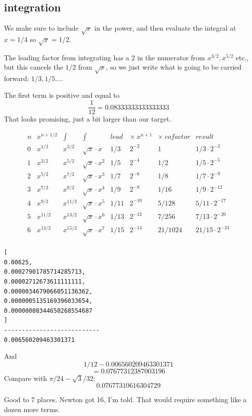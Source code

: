 \documentclass[11pt, oneside]{article}
\begin{document}
\subsection*{integration}

We make sure to include $\sqrt{x}$ in the power, and then evaluate the integral at $x = 1/4$ so $\sqrt{x} = 1/2$.

The leading factor from integrating has a $2$ in the numerator from $x^{3/2}, x^{5/2}$ etc., but this cancels the $1/2$ from $\sqrt{x}$, so we just write what is going to be carried forward:  $1/3, 1/5 \dots$.

The first term is positive and equal to 
\[ \frac{1}{12} = 0.08333333333333333 \]
That looks promising, just a bit larger than our target.

\[
\begin{matrix}
n & x^{n+1/2} & \int & \int & lead & \times \ x^{n+1} & \times \ cofactor & result  \\
0  & x^{1/2} & x^{3/2}  &\sqrt{x} \cdot x & 1/3 & 2^{-2} & 1 & 1/3 \cdot 2^{-2} \\
1  & x^{3/2} & x^{5/2}  & \sqrt{x} \cdot x^2 & 1/5 & 2^{-4} & 1/2 & 1/5 \cdot 2^{-5} \\
2  & x^{5/2}  & x^{7/2}  & \sqrt{x} \cdot x^3 & 1/7 & 2^{-6} & 1/8 &  1/7 \cdot 2^{-9}  \\
3  & x^{7/2}  & x^{9/2}  & \sqrt{x} \cdot x^4 & 1/9 & 2^{-8} &  1/16 & 1/9 \cdot  2^{-12}  \\
4  & x^{9/2} & x^{11/2}  & \sqrt{x} \cdot x^5 & 1/11 & 2^{-10} &  5/128 & 5/11 \cdot 2^{-17}  \\
5  & x^{11/2} & x^{13/2}  & \sqrt{x} \cdot x^6  & 1/13 & 2^{-12} &  7/256  &  7/13 \cdot 2^{-20} \\
6  & x^{13/2} & x^{15/2}  & \sqrt{x} \cdot x^7  & 1/15 & 2^{-14} &  21/1024  &  21/15 \cdot 2^{-24}  \\
\end{matrix}
\] 

\begin{verbatim}
[
0.00625,
0.00027901785714285713,
0.00002712673611111111,
0.0000034679066051136362,
0.0000005135169396033654,
0.00000008344650268554687 
]
---------------------------
0.006560209463301371
\end{verbatim}

And 
\[ 1/12 - 0.006560209463301371 \]
\[ = 0.07677312387003196 \]
Compare with $\pi/24 - \sqrt{3}/32$:
\[ 0.07677310616304729 \]

Good to 7 places.  Newton got 16, I'm told.  That would require something like a dozen more terms.
\end{document}
